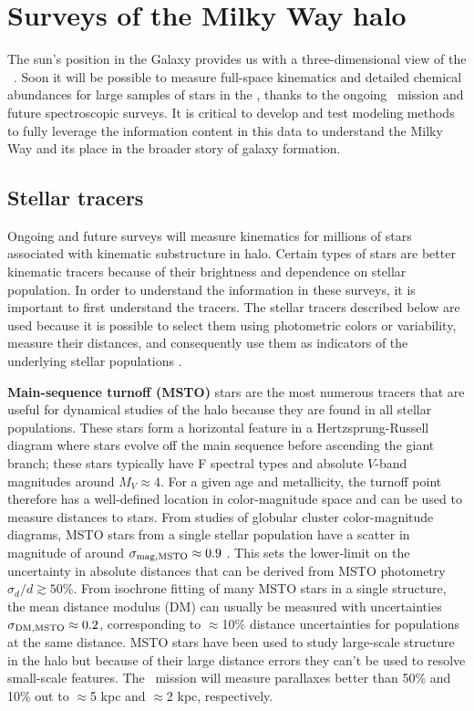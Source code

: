 \section{Surveys of the Milky Way halo} \label{sec:mw-surveys}

The sun's position in the Galaxy provides us with a three-dimensional view of
the \mwhalo\ . Soon it will be possible to measure full-space kinematics and
detailed chemical abundances for large samples of stars in the \mwhalo, thanks
to the ongoing \gaia\ mission and future spectroscopic surveys. It is critical
to develop and test modeling methods to fully leverage the information content
in this data to understand the Milky Way and its place in the broader story of
galaxy formation.

\subsection{Stellar tracers}

Ongoing and future surveys will measure kinematics for millions of stars
associated with kinematic substructure in halo. Certain types of stars are
better kinematic tracers because of their brightness and dependence on stellar
population. In order to understand the information in these surveys, it is
important to first understand the tracers. The stellar tracers described below
are used because it is possible to select them using photometric colors or
variability, measure their distances, and consequently use them as indicators of
the underlying stellar populations \citep[e.g.,][]{bell10, apw15-triand}.

{\bf Main-sequence turnoff (MSTO)} stars are the most numerous tracers that are
useful for dynamical studies of the halo because they are found in all stellar
populations. These stars form a horizontal feature in a Hertzsprung-Russell
diagram where stars evolve off the main sequence before ascending the giant
branch; these stars typically have F spectral types and absolute $V$-band
magnitudes around $M_V \approx 4$. For a given age and metallicity, the turnoff
point therefore has a well-defined location in color-magnitude space and can be
used to measure distances to stars. From studies of globular cluster
color-magnitude diagrams, MSTO stars from a single stellar population have a
scatter in magnitude of around $\sigma_{\rm mag,MSTO} \approx 0.9$
\citep{bell08, bell10}. This sets the lower-limit on the uncertainty in absolute
distances that can be derived from MSTO photometry $\sigma_{d}/d \gtrsim 50\%$.
From isochrone fitting of many MSTO stars in a single structure, the mean
distance modulus (DM) can usually be measured with uncertainties $\sigma_{\rm
DM,MSTO} \approx 0.2$, corresponding to $\approx$10\% distance uncertainties for
populations at the same distance. MSTO stars have been used to study large-scale
structure in the halo \citep[e.g.,][]{newberg02} but because of their large
distance errors they can't be used to resolve small-scale features. The \gaia\
mission will measure parallaxes better than 50\% and 10\% out to $\approx$5 kpc
and $\approx$2 kpc, respectively.

